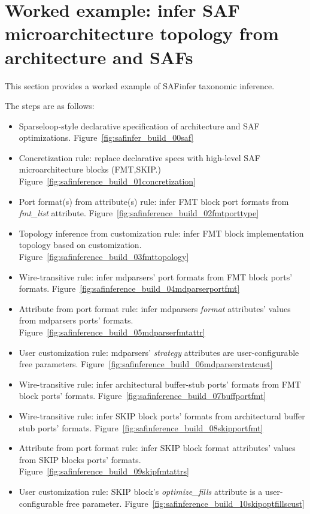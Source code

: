 \chapter{Worked example: infer SAF microarchitecture topology from architecture and SAFs}
\label{appendix:safinfer_build}

This section provides a worked example of SAFinfer taxonomic inference.

The steps are as follows:
\begin{itemize}
    \item Sparseloop-style declarative specification of architecture and SAF optimizations. Figure~\ref{fig:safinfer_build_00saf}
    \item Concretization rule: replace declarative specs with high-level SAF microarchitecture blocks (FMT,SKIP.) Figure~\ref{fig:safinference_build_01concretization}
    \item Port format(s) from attribute(s) rule: infer FMT block port formats from \textit{fmt\_list} attribute. Figure~\ref{fig:safinference_build_02fmtporttype}
    \item Topology inference from customization rule: infer FMT block implementation topology based on customization. Figure~\ref{fig:safinference_build_03fmttopology}
    \item Wire-transitive rule: infer mdparsers' port formats from FMT block ports' formats. Figure~\ref{fig:safinference_build_04mdparserportfmt}
    \item Attribute from port format rule: infer mdparsers \textit{format} attributes' values from mdparsers ports' formats. Figure~\ref{fig:safinference_build_05mdparserfmtattr}
    \item User customization rule: mdparsers' \textit{strategy} attributes are user-configurable free parameters. Figure~\ref{fig:safinference_build_06mdparserstratcust}
    \item Wire-transitive rule: infer architectural buffer-stub ports' formats from FMT block ports' formats. Figure~\ref{fig:safinference_build_07buffportfmt}
    \item Wire-transitive rule: infer SKIP block ports' formats from architectural buffer stub ports' formats. Figure~\ref{fig:safinference_build_08skipportfmt}
    \item Attribute from port format rule: infer SKIP block format attributes' values from SKIP blocks ports' formats. Figure~\ref{fig:safinference_build_09skipfmtattrs}
    \item User customization rule: SKIP block's \textit{optimize\_fills} attribute is a user-configurable free parameter. Figure~\ref{fig:safinference_build_10skipoptfillscust}

\end{itemize}

